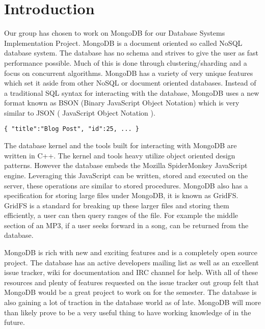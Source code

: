 \documentclass{dependencies/acm_proc_article-sp}
\begin{document}
%

%

\section{Introduction}
Our group has chosen to work on MongoDB for our Database Systems
Implementation Project. MongoDB is a document oriented so called NoSQL
database system. The database has no schema and strives to give the user
as fast performance possible. Much of this is done through clustering/sharding
and a focus on concurrent algorithms. MongoDB has a variety of very unique
features which set it aside from other NoSQL or document oriented databases.
Instead of a traditional SQL syntax for interacting with the database, MongoDB uses
a new format known as BSON (Binary JavaScript Object Notation) which is very similar
to JSON ( JavaScript Object Notation ).
\begin{lstlisting}
{ "title":"Blog Post", "id":25, ... }
\end{lstlisting}

The database kernel and the tools built for interacting with MongoDB are written in
C++. The kernel and tools heavy utilize object oriented design patterns.
However the database embeds the Mozilla SpiderMonkey JavaScript engine.
Leveraging this JavaScript can be written, stored and executed on the server, these
operations are similar to stored procedures. MongoDB also has a specification for storing
large files under MongoDB, it is known as GridFS. GridFS is a standard for breaking up these larger
files and storing them efficiently, a user can then query ranges of the file. For example the middle section
of an MP3, if a user seeks forward in a song, can be returned from the database.

MongoDB is rich with new and exciting features and is a completely open source project.
The database has an active developers mailing list as well as an excellent issue tracker,
wiki for documentation and IRC channel for help. With all of these resources and plenty
of features requested on the issue tracker out group felt that MongoDB would be a great
project to work on for the semester. The database is also gaining a lot of traction in the
database world as of late. MongoDB will more than likely prove to be a very useful thing
to have working knowledge of in the future.
\end{document}
